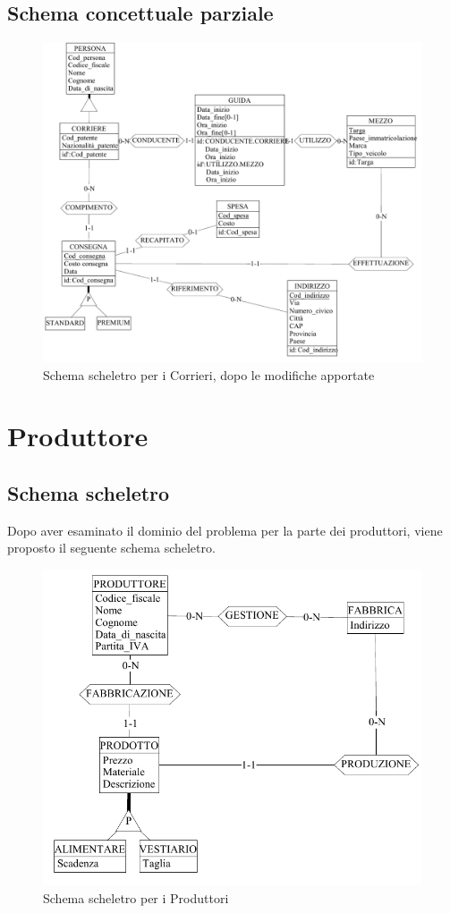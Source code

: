 \documentclass[a4paper,12pt]{report}
\begin{document}
\subsection{Schema concettuale parziale}
\begin{figure}[H]
	\centering{}
	\includegraphics[width=\textwidth]{img/SchemaConcettuale-Corrieri2.pdf}
	\caption{Schema scheletro per i Corrieri, dopo le modifiche apportate}
\end{figure}
\section{Produttore}
\subsection{Schema scheletro}
Dopo aver esaminato il dominio del problema per la parte dei produttori, viene proposto il seguente schema scheletro.
\begin{figure}[H]
	\centering{}
	\includegraphics[width=\textwidth]{img/SchemaConcettuale-Produttori1.pdf}
	\caption{Schema scheletro per i Produttori}
\end{figure}
\end{document}
